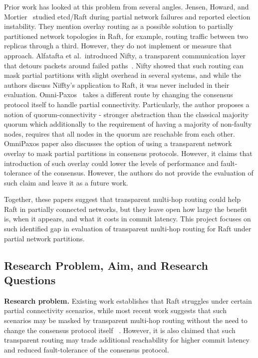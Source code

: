 \documentclass[11pt,a4paper]{article}
\begin{document}
Prior work has looked at this problem from several angles. Jensen, Howard, and Mortier~\cite{jensen2021raft} studied etcd/Raft during partial network failures and reported election instability. They mention overlay routing as a possible solution to partially partitioned network topologies in Raft, for example, routing traffic between two replicas through a third. However, they do not implement or measure that approach.
Alfatafta et al.\ introduced Nifty, a transparent communication layer that detours packets around failed paths~\cite{alfatafta2020nifty}. Nifty showed that such routing can mask partial partitions with slight overhead in several systems, and while the authors discuss Niffty's application to Raft, it was never included in their evaluation.
Omni-Paxos~\cite{ng2023omnipaxos} takes a different route by changing the consensus protocol itself to handle partial connectivity. Particularly, the author proposes a notion of quorum-connectivity - stronger abstraction than the classical majority quorum which additionally to the requirement of having a majority of non-faulty nodes, requires that all nodes in the quorum are reachable from each other.
OmniPaxos paper also discusses the option of using a transparent network overlay to mask partial partitions in consensus protocols. However, it claims that introduction of such overlay could lower the levels of performance and fault-tolerance of the consensus. However, the authors do not provide the evaluation of such claim and leave it as a future work.

Together, these papers suggest that transparent multi-hop routing could help Raft in partially connected networks, but they leave open how large the benefit is, when it appears, and what it costs in commit latency. This project focuses on such identified gap in evaluation of transparent multi-hop routing for Raft under partial network partitions.

\subsection{Research Problem, Aim, and Research Questions}

\textbf{Research problem.}
Existing work establishes that Raft struggles under certain partial connectivity scenarios, while most recent work suggests that such scenarios may be masked by transparent multi-hop routing without the need to change the consensus protocol itself ~\cite{jensen2021raft,alfatafta2020nifty,ng2023omnipaxos}. 
However, it is also claimed that such transparent routing may trade additional reachability for higher commit latency and reduced fault-tolerance of the consensus protocol.
\end{document}
